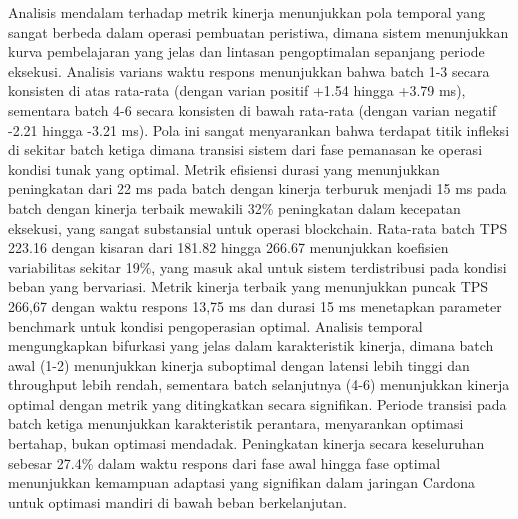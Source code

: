 \begin{table}[h!]
\end{table} Analisis mendalam terhadap metrik kinerja menunjukkan pola temporal yang sangat berbeda dalam operasi pembuatan peristiwa, dimana sistem menunjukkan kurva pembelajaran yang jelas dan lintasan pengoptimalan sepanjang periode eksekusi. Analisis varians waktu respons menunjukkan bahwa batch 1-3 secara konsisten di atas rata-rata (dengan varian positif +1.54 hingga +3.79 ms), sementara batch 4-6 secara konsisten di bawah rata-rata (dengan varian negatif -2.21 hingga -3.21 ms). Pola ini sangat menyarankan bahwa terdapat titik infleksi di sekitar batch ketiga dimana transisi sistem dari fase pemanasan ke operasi kondisi tunak yang optimal. Metrik efisiensi durasi yang menunjukkan peningkatan dari 22 ms pada batch dengan kinerja terburuk menjadi 15 ms pada batch dengan kinerja terbaik mewakili 32\% peningkatan dalam kecepatan eksekusi, yang sangat substansial untuk operasi blockchain. Rata-rata batch TPS 223.16 dengan kisaran dari 181.82 hingga 266.67 menunjukkan koefisien variabilitas sekitar 19\%, yang masuk akal untuk sistem terdistribusi pada kondisi beban yang bervariasi. Metrik kinerja terbaik yang menunjukkan puncak TPS 266,67 dengan waktu respons 13,75 ms dan durasi 15 ms menetapkan parameter benchmark untuk kondisi pengoperasian optimal. Analisis temporal mengungkapkan bifurkasi yang jelas dalam karakteristik kinerja, dimana batch awal (1-2) menunjukkan kinerja suboptimal dengan latensi lebih tinggi dan throughput lebih rendah, sementara batch selanjutnya (4-6) menunjukkan kinerja optimal dengan metrik yang ditingkatkan secara signifikan. Periode transisi pada batch ketiga menunjukkan karakteristik perantara, menyarankan optimasi bertahap, bukan optimasi mendadak. Peningkatan kinerja secara keseluruhan sebesar 27.4\% dalam waktu respons dari fase awal hingga fase optimal menunjukkan kemampuan adaptasi yang signifikan dalam jaringan Cardona untuk optimasi mandiri di bawah beban berkelanjutan.

